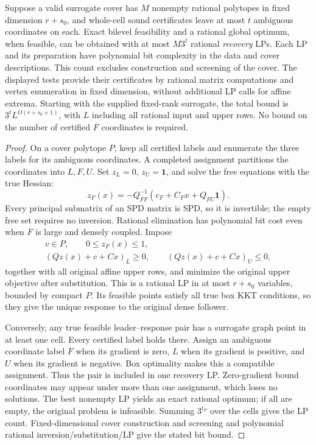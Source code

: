 \begin{theorem}\label{thm:screening-recovery}
Suppose a valid surrogate cover has $M$ nonempty rational polytopes in
fixed dimension $r+s_0$, and whole-cell sound certificates leave at most
$t$ ambiguous coordinates on each. Exact bilevel feasibility and a
rational global optimum, when feasible, can be obtained with at most
$M3^t$ rational \emph{recovery} LPs. Each LP and its preparation have
polynomial bit complexity in the data and cover descriptions. This count
excludes construction and screening of the cover. The displayed tests
provide their certificates by rational matrix computations and vertex
enumeration in fixed dimension, without additional LP calls for affine
extrema. Starting with the supplied fixed-rank surrogate, the total
bound is $3^tL^{O(r+s_0+1)}$, with $L$ including all rational input and
upper rows. No bound on the number of certified $F$ coordinates is
required.
\end{theorem}
\begin{proof}
On a cover polytope $P$, keep all certified labels and enumerate the
three labels for its ambiguous coordinates. A completed assignment
partitions the coordinates into $L,F,U$. Set $z_L=0$, $z_U=\mathbf1$,
and solve the free equations with the true Hessian:
\begin{equation}\label{eq:screening-exact-affine}
 z_F(x)=-Q_{FF}^{-1}(c_F+C_Fx+Q_{FU}\mathbf1).
\end{equation}
Every principal submatrix of an SPD matrix is SPD, so it is invertible;
the empty free set requires no inversion. Rational elimination has
polynomial bit cost even when $F$ is large and densely coupled. Impose
\begin{equation}\label{eq:screening-recovery-lp}
 \begin{gathered}
 v\in P,\qquad 0\le z_F(x)\le1,\\
 (Qz(x)+c+Cx)_L\ge0,\qquad (Qz(x)+c+Cx)_U\le0,
 \end{gathered}
\end{equation}
together with all original affine upper rows, and minimize the original
upper objective after substitution. This is a rational LP in at most
$r+s_0$ variables, bounded by compact $P$. Its feasible points satisfy
all true box KKT conditions, so they give the unique response to the
original dense follower.

Conversely, any true feasible leader--response pair has a surrogate
graph point in at least one cell. Every certified label holds there.
Assign an ambiguous coordinate label $F$ when its gradient is zero,
$L$ when its gradient is positive, and $U$ when its gradient is negative.
Box optimality makes this a compatible assignment. Thus the pair is
included in one recovery LP. Zero-gradient bound coordinates may appear
under more than one assignment, which loses no solutions. The best
nonempty LP yields an exact rational optimum; if all are empty, the
original problem is infeasible. Summing $3^{t_P}$ over the cells gives
the LP count. Fixed-dimensional cover construction and screening and
polynomial rational inversion/substitution/LP give the stated bit bound.
\end{proof}

